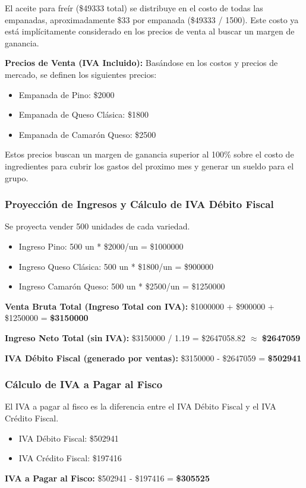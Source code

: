 \documentclass[12pt]{article}
\begin{document}
El aceite para freír (\$\num{49333} total) se distribuye en el costo de todas las empanadas, aproximadamente \$\num{33} por empanada (\$\num{49333} / 1500). Este costo ya está implícitamente considerado en los precios de venta al buscar un margen de ganancia.

\textbf{Precios de Venta (IVA Incluido):}
Basándose en los costos y precios de mercado, se definen los siguientes precios:
\begin{itemize}
    \item Empanada de Pino: \$\num{2000}
    \item Empanada de Queso Clásica: \$\num{1800}
    \item Empanada de Camarón Queso: \$\num{2500}
\end{itemize}
Estos precios buscan un margen de ganancia superior al 100\% sobre el costo de ingredientes para cubrir los gastos del proximo mes y generar un sueldo para el grupo.

\subsubsection{Proyección de Ingresos y Cálculo de IVA Débito Fiscal}
Se proyecta vender 500 unidades de cada variedad.
\begin{itemize}
    \item Ingreso Pino: 500 un * \$\num{2000}/un = \$\num{1000000}
    \item Ingreso Queso Clásica: 500 un * \$\num{1800}/un = \$\num{900000}
    \item Ingreso Camarón Queso: 500 un * \$\num{2500}/un = \$\num{1250000}
\end{itemize}
\textbf{Venta Bruta Total (Ingreso Total con IVA):} \$\num{1000000} + \$\num{900000} + \$\num{1250000} = \textbf{\$\num{3150000}}

\textbf{Ingreso Neto Total (sin IVA):} \$\num{3150000} / 1.19 = \$\num{2647058.82} $\approx$ \textbf{\$\num{2647059}}

\textbf{IVA Débito Fiscal (generado por ventas):} \$\num{3150000} - \$\num{2647059} = \textbf{\$\num{502941}}

\subsubsection{Cálculo de IVA a Pagar al Fisco}
El IVA a pagar al fisco es la diferencia entre el IVA Débito Fiscal y el IVA Crédito Fiscal.
\begin{itemize}
    \item IVA Débito Fiscal: \$\num{502941}
    \item IVA Crédito Fiscal: \$\num{197416}
\end{itemize}
\textbf{IVA a Pagar al Fisco:} \$\num{502941} - \$\num{197416} = \textbf{\$\num{305525}}
\end{document}
